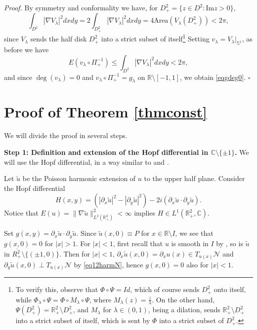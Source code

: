 \documentclass[12pt, a4paper]{article}
\newenvironment{proof}{\noindent\emph{Proof.}}{\hfill$\square$\medskip}
\newcommand{\sph}{\mathbb{S}}
\newcommand{\R}{\mathbb{R}}
\renewcommand{\(}{\left(}
\renewcommand{\)}{\right)}
\begin{document}
\begin{proof}
By symmetry and conformality we have, for $D^2_+=\{z\in D^2:\mathrm{Im}z> 0\}$,
$$\int_{D^2} |\nabla V_\lambda|^2 dxdy=2\int_{D^2_+} |\nabla V_\lambda|^2 dxdy=4 \mathrm{Area}(V_\lambda(D^2_+)) <2\pi,$$
since $V_\lambda$ sends the half disk $D^2_+$ into a strict subset of itself\footnote{To verify this, observe that $\Phi\circ\Psi=Id$, which of course sends $D^2_+$ onto itself, while $\Phi_\lambda\circ \Psi=\Phi\circ M_\lambda\circ\Psi$, where $M_\lambda (z)=\tfrac{z}{\lambda}$. On the other hand, $\Psi(D^2_+)=\R^2_+\setminus D^2_+$, and $M_\lambda$ for $\lambda\in (0,1)$, being a dilation, sends $\R^2_+\setminus D^2_+$ into a strict subset of itself, which is sent by $\Phi$ into a strict subset of $D^2_+$.} 
Setting $v_\lambda= V_\lambda|_{\sph^1}$, as before we have
$$E(v_\lambda\circ \Pi_+^{-1}) \le  \int_{D^2} |\nabla V_\lambda|^2 dxdy<2\pi,$$
and since $\deg(v_\lambda)=0$ and $v_\lambda\circ\Pi_+^{-1}=g_\lambda$ on $\R\setminus [-1,1]$, we obtain \eqref{eqgdeg0}.
\end{proof}



\section{Proof of Theorem \ref{thmconst}}



We will divide the proof in several steps.

\medskip

\noindent\textbf{Step 1: Definition and extension of the Hopf differential in $\mathbb{C}\setminus\{\pm 1\}$.}  We will use the Hopf differential, in a way similar to  \cite[Lemma 4.27]{milsir} and \cite[Sec. 4.2]{DLR3}. 

Let $\tilde u$ be the Poisson harmonic extension of $u$ to the upper half plane. Consider the Hopf differential
$$H(x,y)=\left(|\partial_x \tilde u|^2-|\partial _y \tilde u|^2\right)-2i\left(\partial _x \tilde u\cdot \partial_y \tilde u\right).$$
Notice that $E(u)=\|\nabla \tilde u\|_{L^2(\R^2_+)}^2<\infty$ implies $H\in L^1(\R^2_+,\mathbb{C})$.

Set $g(x,y)=\partial_x \tilde u\cdot \partial_y \tilde u$. Since $\tilde u (x,0)\equiv P$ for $x\in \R\setminus I$, we see that $g(x,0)=0$ for $|x|>1$. For $|x|<1$, first recall that $u$ is smooth in $I$ by \cite{DLR2}, so is $\tilde u$ in $\overline{R^2_+}\setminus \{(\pm 1,0)\}$. Then for $|x|<1$, $\partial_x \tilde u(x,0)=\partial_x u(x)\in T_{u(x)}\mathcal{N}$ and $\partial_y \tilde u (x,0)\perp T_{u(x)}\mathcal{N}$ by \eqref{eq12harmN}, hence $g(x,0)=0$ also for $|x|<1$. %
\end{document}
